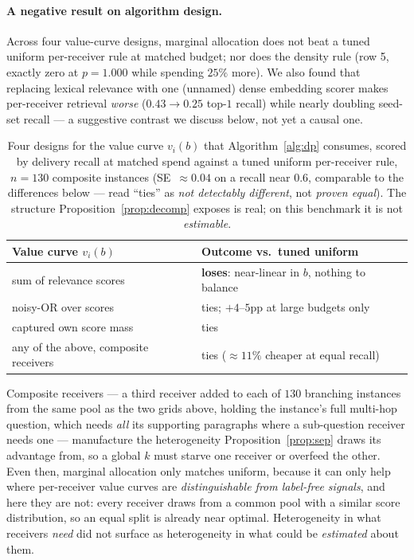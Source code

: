 \documentclass[sigconf,anonymous]{aamas}
\theoremstyle{remark}
\begin{document}
\paragraph{A negative result on algorithm design.} Across four
value-curve designs, marginal allocation does not beat a tuned uniform
per-receiver rule at matched budget; nor does the density rule
(row 5, exactly zero at $p=1.000$ while spending $25\%$ more). We also found that replacing lexical relevance with one (unnamed)
dense embedding scorer makes per-receiver retrieval \emph{worse}
($0.43 \to 0.25$ top-$1$ recall) while nearly doubling seed-set recall
--- a suggestive contrast we discuss below, not yet a causal one.

\begin{table}[t]
\centering
\caption{Four designs for the value curve $v_i(b)$ that
Algorithm~\ref{alg:dp} consumes, scored by delivery recall at matched
spend against a tuned uniform per-receiver rule, $n=130$ composite
instances (SE~$\approx\!0.04$ on a recall near $0.6$, comparable to
the differences below --- read ``ties'' as \emph{not detectably
different}, not \emph{proven equal}). The structure
Proposition~\ref{prop:decomp} exposes is real; on this benchmark it is
not \emph{estimable}.}
\label{tab:curves}
\begin{tabular}{p{3.9cm}p{3.6cm}}
\toprule
Value curve $v_i(b)$ & Outcome vs.\ tuned uniform \\
\midrule
sum of relevance scores & \textbf{loses}: near-linear in $b$, nothing
to balance \\
noisy-OR over scores & ties; $+4$--$5$pp at large budgets only \\
captured own score mass & ties \\
any of the above, composite receivers & ties ($\approx 11\%$ cheaper
at equal recall) \\
\bottomrule
\end{tabular}
\end{table}

Composite receivers --- a third receiver added to each of $130$
branching instances from the same pool as the two grids above, holding
the instance's full multi-hop question, which needs \emph{all} its
supporting paragraphs where a sub-question receiver needs one ---
manufacture the heterogeneity Proposition~\ref{prop:sep} draws its
advantage from, so a global $k$ must starve one receiver or overfeed
the other. Even then, marginal allocation only matches
uniform, because it can only help where per-receiver value curves are
\emph{distinguishable from label-free signals}, and here they are not:
every receiver draws from a common pool with a similar score
distribution, so an equal split is already near optimal. Heterogeneity
in what receivers \emph{need} did not surface as heterogeneity in what
could be \emph{estimated} about them.
\end{document}
